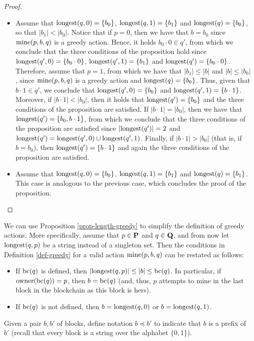 \begin{proof}
\begin{itemize}
\item Assume that ${\text{\rm longest}}(q,0) = \{b_0\}$,  ${\text{\rm longest}}(q, 1) = \{b_1\}$ and ${\text{\rm longest}}(q) = \{b_0\}$, so that $|b_1| < |b_0|$. Notice that if $p =0$, then we have that $b=b_0$ since $\text{\rm mine}(p,b,q)$ is a greedy action. Hence, it holds $b_0 \cdot 0 \in q'$, from which we conclude that the three conditions of the proposition hold since ${\text{\rm longest}}(q',0) = \{b_0 \cdot 0\}$, ${\text{\rm longest}}(q',1) = \{b_1\}$ and ${\text{\rm longest}}(q') = \{b_0 \cdot 0\}$. Therefore, assume that $p = 1$, from which we have that  $|b_1| \leq |b|$ and $|b| \leq |b_0|$, since $\text{\rm mine}(p,b,q)$ is a greedy action and ${\text{\rm longest}}(q) = \{b_0\}$. Thus, given that $b \cdot 1 \in q'$, we conclude that ${\text{\rm longest}}(q',0) = \{b_0\}$ and ${\text{\rm longest}}(q',1) = \{b \cdot 1\}$. 
Moreover, if $|b \cdot 1| < |b_0|$, then it holds that ${\text{\rm longest}}(q') = \{b_0\}$ and the three conditions of the proposition are satisfied. If $|b \cdot 1| = |b_0|$, then we have that ${\text{\rm longest}}(q') = \{b_0, b \cdot 1\}$, from which we conclude that the three conditions of the proposition are satisfied since $|{\text{\rm longest}}(q')| = 2$ and ${\text{\rm longest}}(q') = {\text{\rm longest}}(q',0) \cup {\text{\rm longest}}(q',1)$. Finally, if $|b \cdot 1| > |b_0|$ (that is, if $b = b_0$), then ${\text{\rm longest}}(q') = \{b \cdot 1\}$ and again the three conditions of the proposition are satisfied.

\item Assume that ${\text{\rm longest}}(q,0) = \{b_0\}$,  ${\text{\rm longest}}(q, 1) = \{b_1\}$ and ${\text{\rm longest}}(q) = \{b_1\}$. This case is analogous to the previous case, which concludes the proof of the proposition.
\end{itemize}
\end{proof}
We can use Proposition \ref{prop-length-greedy} to simplify the definition of greedy actions. More specifically, assume that $p \in \mathbf{P}$ and $q \in \mathbf{Q}$, and from now let ${\text{\rm longest}}(q,p)$ be a string instead of a singleton set. Then the conditions in Definition \ref{def-greedy} for a valid action $\text{\rm mine}(p,b,q)$ can be restated as follows:
\begin{itemize}
\item If $\text{bc}(q)$ is defined, then $|{\text{\rm longest}}(q,p)| \leq |b|  \leq \text{bc}(q)$. In particular, if $\text{\rm owner}(\text{bc}(q)) = p$, then $b = \text{bc}(q)$ (and, thus, $p$ attempts to mine in the last block in the blockchain as this block is hers).

\item If $\text{bc}(q)$ is not defined, then $b = {\text{\rm longest}}(q,0)$  or $b = {\text{\rm longest}}(q,1)$. 
\end{itemize}
Given a pair $b, b' $ of blocks, define notation $b \preceq b'$ to indicate that $b$ is a prefix of $b'$ (recall that every block is a string over the alphabet $\{0, 1\}$). 
